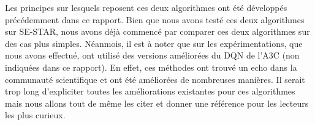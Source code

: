 Les principes sur lesquels reposent ces deux algorithmes ont été développés précédemment dans ce rapport. Bien que nous avons testé ces deux algorithmes sur SE-STAR, nous avons déjà commencé par comparer ces deux algorithmes sur des cas plus simples. Néanmois, il est à noter que sur les expérimentations, que nous avons effectué, ont utilisé des versions améliorées du DQN de l'A3C (non indiquées dans ce rapport). En effet, ces méthodes ont trouvé un echo dans la communauté scientifique et ont été améliorées de nombreuses manières. Il serait trop long d'expliciter toutes les améliorations existantes pour ces algorithmes mais nous allons tout de même les citer et donner une référence pour les lecteurs les plus curieux.


\setlength{\arrayrulewidth}{.45mm}
\setlength{\tabcolsep}{12pt}
\renewcommand{\arraystretch}{2.}

